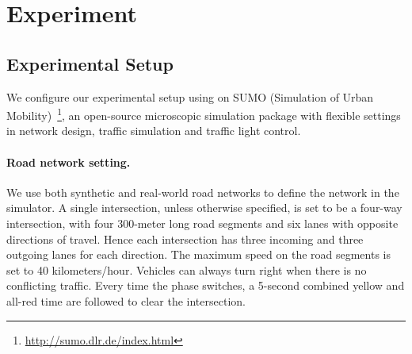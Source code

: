 \section{Experiment}



\subsection{Experimental Setup}
We configure our experimental setup using on SUMO (Simulation of Urban Mobility)~\footnote{\url{http://sumo.dlr.de/index.html}}, an open-source microscopic simulation package with flexible settings in network design, traffic simulation and traffic light control.

\paragraph{Road network setting.}We use both synthetic and real-world road networks to define the network in the simulator. A single intersection, unless otherwise specified, is set to be a four-way intersection, with four 300-meter long road segments and six lanes with opposite directions of travel. Hence each intersection has three incoming and three outgoing lanes for each direction. The maximum speed on the road segments is set to 40 kilometers/hour. Vehicles can always turn right when there is no conflicting traffic. Every time the phase switches, a 5-second combined yellow and all-red time are followed to clear the intersection.




